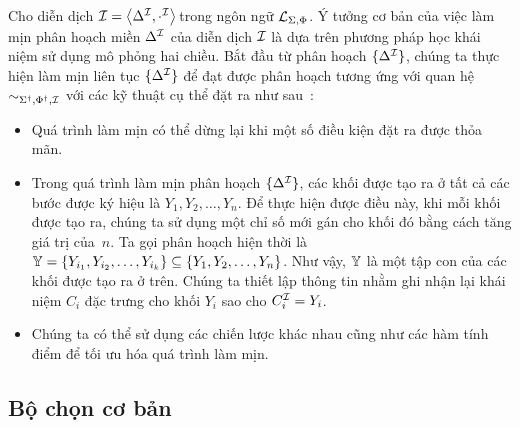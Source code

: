 Cho diễn dịch $\mathcal{I} = \left\langle\Delta^{\mathcal{I}}, \cdot^{\mathcal{I}}\right\rangle\!$ trong ngôn ngữ $\mathcal{L}_{\Sigma,\Phi}$. Ý tưởng cơ bản của việc làm mịn phân hoạch miền $\Delta^{\mathcal{I}}$ của diễn dịch $\mathcal{I}$ là dựa trên phương pháp học khái niệm sử dụng mô phỏng hai chiều. Bắt đầu từ phân hoạch $\{\Delta^{\mathcal{I}}\}$, chúng ta thực hiện làm mịn liên tục $\{\Delta^{\mathcal{I}}\}$ để đạt được phân hoạch tương ứng với quan hệ $\sim_{\Sigma^\dag,\Phi^\dag,\mathcal{I}}$ với các kỹ thuật cụ thể đặt ra như sau~\cite{Nguyen2013}:
\begin{itemize}
	\item Quá trình làm mịn có thể dừng lại khi một số điều kiện đặt ra được thỏa mãn.		
	\item Trong quá trình làm mịn phân hoạch $\{\Delta^{\mathcal{I}}\}$, các khối được tạo ra ở tất cả các bước được ký hiệu là $Y_1, Y_2, \ldots, Y_n$. Để thực hiện được điều này, khi mỗi khối được tạo ra, chúng ta sử dụng một chỉ số mới gán cho khối đó bằng cách tăng giá trị của~$n$. Ta gọi phân hoạch hiện thời là $\mathbb{Y} = \{Y_{i_1}, Y_{i_2}, \ldots, Y_{i_k}\} \subseteq \{Y_1, Y_2, \ldots, Y_n\}$. Như vậy, $\mathbb{Y}$ là một tập con của các khối được tạo ra ở trên. Chúng ta thiết lập thông tin nhằm ghi nhận lại khái niệm $C_i$ đặc trưng cho khối $Y_i$ sao cho $C_i^{\mathcal{I}} = Y_i$.
	\item Chúng ta có thể sử dụng các chiến lược khác nhau cũng như các hàm tính điểm để tối ưu hóa quá trình làm mịn.
\end{itemize}

\subsection{Bộ chọn cơ bản}
\label{sec:Chap3.BasicSelectors}

